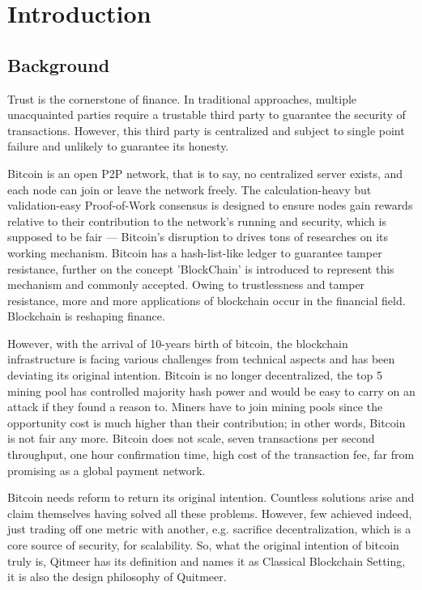 \documentclass[a4paper,11pt]{article}
\begin{document}
\section{Introduction}

\subsection{Background}
Trust is the cornerstone of finance. In traditional approaches, multiple unacquainted parties require a trustable third party to guarantee the security of transactions. However, this third party is centralized and subject to single point failure and unlikely to guarantee its honesty. 

Bitcoin is an open P2P network, that is to say, no centralized server exists, and each node can join or leave the network freely. The calculation-heavy but validation-easy Proof-of-Work consensus is designed to ensure nodes gain rewards relative to their contribution to the network's running and security, which is supposed to be fair — Bitcoin's disruption to drives tons of researches on its working mechanism. Bitcoin has a hash-list-like ledger to guarantee tamper resistance, further on the concept 'BlockChain' is introduced to represent this mechanism and commonly accepted. Owing to trustlessness and tamper resistance, more and more applications of blockchain occur in the financial field. Blockchain is reshaping finance.

However, with the arrival of 10-years birth of bitcoin, the blockchain infrastructure is facing various challenges from technical aspects and has been deviating its original intention. Bitcoin is no longer decentralized, the top 5 mining pool has controlled majority hash power and would be easy to carry on an attack if they found a reason to. Miners have to join mining pools since the opportunity cost is much higher than their contribution; in other words, Bitcoin is not fair any more. Bitcoin does not scale, seven transactions per second throughput, one hour confirmation time, high cost of the transaction fee, far from promising as a global payment network.

Bitcoin needs reform to return its original intention. Countless solutions arise and claim themselves having solved all these problems. However, few achieved indeed, just trading off one metric with another, e.g. sacrifice decentralization, which is a core source of security, for scalability. So, what the original intention of bitcoin truly is, Qitmeer has its definition and names it as Classical Blockchain Setting, it is also the design philosophy of Quitmeer.
\end{document}
